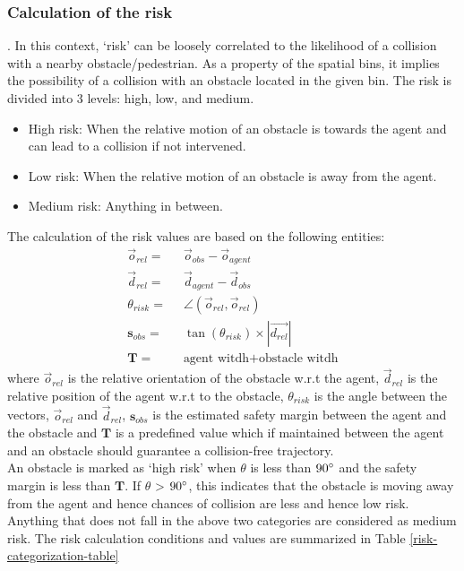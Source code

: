 \subsubsection*{Calculation of the risk}
. In this context, `risk' can be loosely correlated to the likelihood of a collision with a nearby obstacle/pedestrian. As a property of the spatial bins, it implies the possibility of a collision with an obstacle located in the given bin. 
The risk is divided into 3 levels: high, low, and medium.
\begin{itemize}
    \item High risk:
When the relative motion of an obstacle is towards the agent and can lead to a collision if not intervened.
    \item Low risk:
When the relative motion of an obstacle is away from the agent.
    \item Medium risk:
Anything in between.
\end{itemize}
The calculation of the risk values are based on the following entities:
\begin{align}
    \vec{o}_{rel} = & \;\; \vec{o}_{obs} - \vec{o}_{agent}  \\
    \vec{d}_{rel} =  &\;\; \vec{d}_{agent} - \vec{d}_{obs} \\
    \theta_{risk} =  & \;\; \angle (\vec{o}_{rel}, \vec{o}_{rel}) \\
    \mathbf{s}_{obs} = & \;\; \tan(\theta_{risk}) \times |\vec{d_{rel}}| \\
    \mathbf{T} = & \;\; \text{agent witdh} + \text{obstacle witdh}
\end{align}
where $\vec{o}_{rel}$ is the relative orientation of the obstacle w.r.t the agent, $\vec{d}_{rel}$ is the relative position of the agent w.r.t to the obstacle, $\theta_{risk}$ is the angle between the vectors, $\vec{o}_{rel}$ and $\vec{d}_{rel}$,  $\mathbf{s}_{obs}$ is the estimated safety margin between the agent and the obstacle and $\mathbf{T}$ is a predefined value which if maintained between the agent and an obstacle should guarantee a collision-free trajectory.\\
An obstacle is marked as `high risk' when $\theta$ is less than $90\degree$ and the safety margin is less than $\mathbf{T}$.   If $\theta$ > $90 \degree$, this indicates that the obstacle is moving away from the agent and hence chances of collision are less and hence low risk. Anything that does not fall in the above two categories are considered as medium risk. The risk calculation conditions and values are summarized in Table \ref{risk-categorization-table}
